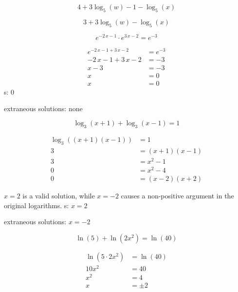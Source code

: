 \documentclass[addpoints]{exam}
\begin{document}
\begin{questions}
\begin{solution}
\[4 + 3\log_{5}(w) - 1 - \log_{5}(x)\]

\[\boxed{ 3 + 3\log_{5}(w) - \log_{5}(x) }\]
\end{solution}
\newpage


\question[6] \label{exact-start}  \[e^{-2 \, x - 1} \cdot e^{3 \, x - 2} = e^{-3}\]
\begin{solution}
\[\begin{aligned} e^{-2 \, x - 1+3 \, x - 2} &= e^{-3} \\ -2 \, x - 1+3 \, x - 2 &= -3 \\ x - 3 &= -3 \\ x &= 0 \\ x &= 0 \end{aligned}\]
s: \(\boxed{ 0 }\)

extraneous solutions: \(\boxed{ \text{none} }\)
\end{solution}


\question[6]  \[\log_{3}(x + 1) + \log_{3}(x - 1) = 1\]
\begin{solution}
\[\begin{aligned} \log_{3}((x + 1)(x - 1)) &= 1 \\ 3 &= (x + 1)(x - 1) \\ 3 &= x^{2} - 1 \\ 0 &= x^{2} - 4 \\ 0 &= (x - 2)(x + 2) \end{aligned}\]

 \(x = 2\) is a valid solution, while \(x = -2\) causes a non-positive argument in the original logarithms. 
s: \(\boxed{ x = 2 }\)

extraneous solutions: \(\boxed{ x = -2 }\)
\end{solution}


\question[6] \label{exact-end}  \[\ln(5) + \ln(2x^2) = \ln(40)\]
\begin{solution}
\[\begin{aligned} \ln(5 \cdot 2x^2) &= \ln(40) \\ 10x^2 &= 40 \\ x^2 &= 4 \\ x &= \pm 2 \end{aligned}\]


\end{solution}
\end{questions}
\end{document}
